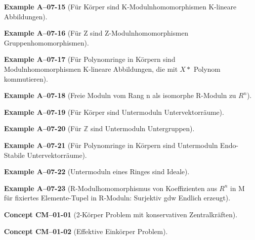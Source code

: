 \documentclass[10pt, letterpaper]{article}
\newcommand{\Z}{\mathbb{Z}}
\newcommand{\CustomHeading}[3]{%
  \par\medskip\noindent%
  \textbf{#1 #2} \textnormal{(#3)}.\enskip%
}
\newenvironment{EXA}[2]{\CustomHeading{Example}{#1}{#2}}{}
\newenvironment{CONC}[2]{\CustomHeading{Concept}{#1}{#2}}{}
\begin{document}
\begin{EXA}{A--07-15}{Für Körper sind K-Modulnhomomorphismen K-lineare Abbildungen}
\end{EXA}

\begin{EXA}{A--07-16}{Für Z sind Z-Modulnhomomorphismen Gruppenhomomorphismen}
\end{EXA}

\begin{EXA}{A--07-17}{Für Polynomringe in Körpern sind Modulnhomomorphismen K-lineare Abbildungen, die mit $X*$ Polynom kommutieren}
\end{EXA}

\begin{EXA}{A--07-18}{Freie Moduln vom Rang n als isomorphe R-Moduln zu $R^n$}
\end{EXA}

\begin{EXA}{A--07-19}{Für Körper sind Untermoduln Untervektorräume}
\end{EXA}

\begin{EXA}{A--07-20}{Für $\Z$ sind Untermoduln Untergruppen}
\end{EXA}

\begin{EXA}{A--07-21}{Für Polynomringe in Körpern sind Untermoduln Endo-Stabile Untervektorräume}
\end{EXA}

\begin{EXA}{A--07-22}{Untermoduln eines Ringes sind Ideale}
\end{EXA}

\begin{EXA}{A--07-23}{R-Modulhomomorphismus von Koeffizienten aus $R^n$ in M für fixiertes Elemente-Tupel in R-Moduln: Surjektiv gdw Endlich erzeugt}
\end{EXA}

\begin{CONC}{CM--01-01}{2-Körper Problem mit konservativen Zentralkräften}
\end{CONC}

\begin{CONC}{CM--01-02}{Effektive Einkörper Problem}
\end{CONC}
\end{document}
